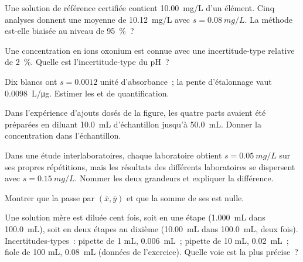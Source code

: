 \begin{exercise}[$\star\star$]\label{exo:b2:measurement-statistics:5}
Une solution de référence certifiée contient \qty{10.00}{mg/L} d'un élément. Cinq analyses donnent une
moyenne de
\qty{10.12}{mg/L} avec $s = \qty{0.08}{mg/L}$. La méthode est-elle biaisée au niveau de 95~\%~?
\end{exercise}

\begin{exercise}[$\star\star$]\label{exo:b2:measurement-statistics:6}
Une concentration en ions oxonium est connue avec une incertitude-type relative de 2~\%. Quelle est
l'incertitude-type du pH~?
\end{exercise}

\begin{exercise}[$\star\star$]\label{exo:b2:measurement-statistics:7}
Dix blancs ont $s = 0.0012$ unité d'absorbance~; la pente d'étalonnage vaut \qty{0.0098}{L/\micro g}.
Estimer les  et de quantification.
\end{exercise}

\begin{exercise}[$\star\star$]\label{exo:b2:measurement-statistics:8}
Dans l'expérience d'ajouts dosés de la figure, les quatre parts avaient été préparées en diluant
\qty{10.0}{mL} d'échantillon jusqu'à \qty{50.0}{mL}. Donner la concentration dans l'échantillon.
\end{exercise}

\begin{exercise}[$\star\star$]\label{exo:b2:measurement-statistics:9}
Dans une étude interlaboratoires, chaque laboratoire obtient $s = \qty{0.05}{mg/L}$ sur ses propres
répétitions, mais les résultats des différents laboratoires se dispersent avec $s = \qty{0.15}{mg/L}$.
Nommer les deux grandeurs et expliquer la différence.
\end{exercise}

\begin{exercise}[$\star\star\star$]\label{exo:b2:measurement-statistics:10}
Montrer que la  passe par $(\bar x, \bar y)$ et que la somme de ses  est nulle.
\end{exercise}

\begin{exercise}[$\star\star\star$]\label{exo:b2:measurement-statistics:11}
Une solution mère est diluée cent fois, soit en une étape (\qty{1.000}{mL} dans \qty{100.0}{mL}), soit
en deux étapes au dixième (\qty{10.00}{mL} dans \qty{100.0}{mL}, deux fois). Incertitudes-types~: pipette
de 1 mL, \qty{0.006}{mL}~; pipette de 10 mL, \qty{0.02}{mL}~; fiole de 100 mL, \qty{0.08}{mL} (données de
l'exercice). Quelle voie est la plus précise~?
\end{exercise}


